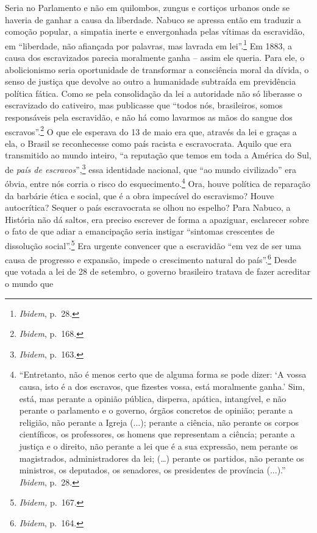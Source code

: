 Seria no Parlamento e não em quilombos, zungus e cortiços urbanos onde
se haveria de ganhar a causa da liberdade. Nabuco se apressa então em
traduzir a comoção popular, a simpatia inerte e envergonhada pelas
vítimas da escravidão, em ``liberdade, não afiançada por palavras, mas
lavrada em lei''.\footnote{\emph{Ibidem}, p.~28.} Em 1883, a causa dos
escravizados parecia moralmente ganha -- assim ele queria. Para ele, o
abolicionismo seria oportunidade de transformar a consciência moral da
dívida, o senso de justiça que devolve ao outro a humanidade subtraída
em previdência política fática. Como se pela consolidação da lei a
autoridade não só liberasse o escravizado do cativeiro, mas publicasse
que ``todos nós, brasileiros, somos responsáveis pela escravidão, e não
há como lavarmos as mãos do sangue dos escravos''.\footnote{\emph{Ibidem},
  p.~168.} O que ele esperava do 13 de maio era que, através da lei e
graças a ela, o Brasil se reconhecesse como país racista e escravocrata.
Aquilo que era transmitido ao mundo inteiro, ``a reputação que temos em
toda a América do Sul, de \emph{país de escravos}'',\footnote{\emph{Ibidem},
  p.~163.} essa identidade nacional, que ``ao mundo civilizado'' era
óbvia, entre nós corria o risco do esquecimento.\footnote{``Entretanto,
  não é menos certo que de alguma forma se pode dizer: `A vossa causa,
  isto é a dos escravos, que fizestes vossa, está moralmente ganha.'
  Sim, está, mas perante a opinião pública, dispersa, apática,
  intangível, e não perante o parlamento e o governo, órgãos concretos
  de opinião; perante a religião, não perante a Igreja (...); perante a
  ciência, não perante os corpos científicos, os professores, os homens
  que representam a ciência; perante a justiça e o direito, não perante
  a lei que é a sua expressão, nem perante os magistrados,
  administradores da lei; (\ldots{}) perante os partidos, não perante os
  ministros, os deputados, os senadores, os presidentes de província
  (...).'' \emph{Ibidem}, p.~28.} Ora, houve política de reparação da
barbárie ética e social, que é a obra impecável do escravismo? Houve
autocrítica? Sequer o país escravocrata se olhou no espelho? Para
Nabuco, a História não dá saltos, era preciso escrever de forma a
apaziguar, esclarecer sobre o fato de que adiar a emancipação seria
instigar ``sintomas crescentes de dissolução social''.\footnote{\emph{Ibidem,}
  p.~167.} Era urgente convencer que a escravidão ``em vez de ser uma
causa de progresso e expansão, impede o crescimento natural do
país''.\footnote{\emph{Ibidem}, p.~164.} Desde que votada a lei de 28 de
setembro, o governo brasileiro tratava de fazer acreditar o mundo que
